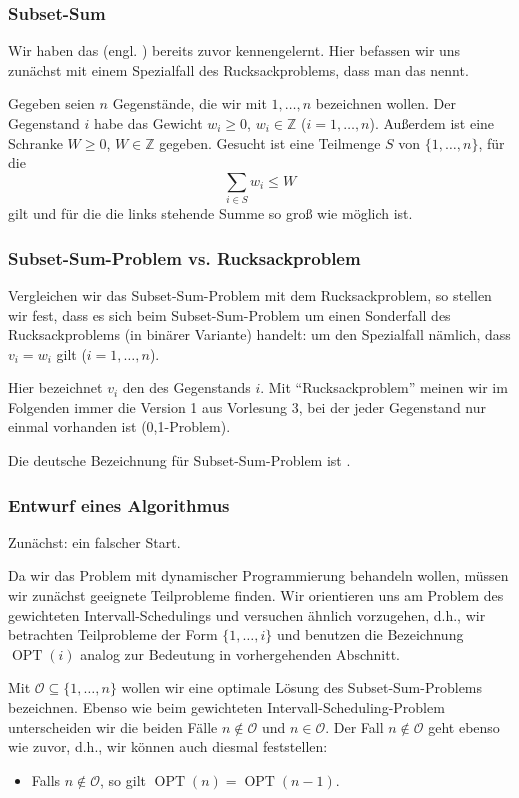 \documentclass[smaller]{beamer}
\renewcommand{\O}{\mathcal{O}}
\DeclareMathOperator{\opt}{OPT}
\newcommand{\Z}{\mathbb{Z}}
\begin{document}
\begin{frame}
\frametitle{Subset-Sum}
Wir haben das  (engl. ) bereits zuvor kennengelernt. Hier befassen wir uns zunächst mit einem \alert{Spezialfall des Rucksackproblems}, dass man das  nennt. \\ \medskip
 
Gegeben seien $n$ \alert{Gegenstände}, die wir mit $1,\ldots,n$ bezeichnen wollen. Der Gegenstand $i$ habe das Gewicht $w_i \geq 0$, $w_i \in \Z$ ($i=1,\ldots,n$). Außerdem ist eine Schranke $W \geq 0$, $W \in \Z$ gegeben. Gesucht ist eine Teilmenge $S$ von $\{ 1,\ldots,n \}$, für die
\[
\sum\limits_{i \in S}{w_i} \leq W
\]
gilt und für die die links stehende Summe so groß wie möglich ist.
\end{frame}

\begin{frame}
 \frametitle{Subset-Sum-Problem vs. Rucksackproblem}
 Vergleichen wir das Subset-Sum-Problem mit dem Rucksackproblem, so stellen wir fest, dass es sich beim Subset-Sum-Problem um einen Sonderfall des Rucksackproblems (in binärer Variante) handelt: um den Spezialfall nämlich, dass $v_i=w_i$ gilt ($i=1,\ldots,n$). \\ \medskip
 
 Hier bezeichnet $v_i$ den   des Gegenstands $i$. 
 Mit \enquote{Rucksackproblem} meinen wir im Folgenden immer die Version 1 aus Vorlesung 3, bei der jeder Gegenstand nur einmal vorhanden ist (0,1-Problem). \\ \medskip
 
 Die deutsche Bezeichnung für Subset-Sum-Problem ist .
\end{frame}

\begin{frame}
 \frametitle{Entwurf eines Algorithmus}
 Zunächst: \alert{ein falscher Start}. \\ \medskip

Da wir das Problem mit dynamischer Programmierung behandeln wollen, müssen wir zunächst geeignete Teilprobleme finden. Wir orientieren uns am Problem des gewichteten Intervall-Schedulings und versuchen ähnlich vorzugehen, d.h., wir betrachten Teilprobleme der Form $\{ 1,\ldots,i \}$ und benutzen die Bezeichnung $\opt{(i)}$ analog zur Bedeutung in vorhergehenden Abschnitt. \\ \medskip

Mit $\O \subseteq \{ 1,\ldots,n \}$ wollen wir eine optimale Lösung des Subset-Sum-Problems bezeichnen. Ebenso wie beim gewichteten Intervall-Scheduling-Problem unterscheiden wir die beiden Fälle $n \notin \O$ und $n \in \O$. Der Fall $n \notin \O$ geht ebenso wie zuvor, d.h., wir können auch diesmal feststellen: 
\begin{itemize}
\item Falls $n \notin \O$, so gilt $\opt{(n)} = \opt{(n-1)}$.
\end{itemize}
\end{frame}
\end{document}
